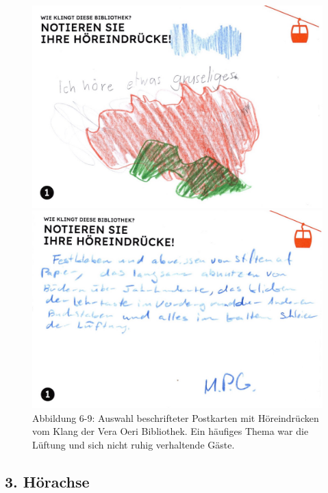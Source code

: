 \documentclass[a4paper,
fontsize=11pt,
oneside,
numbers=noperiodatend,
parskip=half-,
bibliography=totoc,
final
]{scrartcl}
\begin{document}
\begin{figure}[H]
    \begin{minipage}[b]{0.45\textwidth}
        \centering
        \includegraphics[width=\textwidth]{img/Abb8.jpg}
    \end{minipage}
    \begin{minipage}[b]{0.45\textwidth}
        \centering
        \includegraphics[width=\textwidth]{img/Abb9.jpg}
    \end{minipage}
    
    \caption{Abbildung 6-9: Auswahl beschrifteter Postkarten mit Höreindrücken vom Klang der Vera Oeri Bibliothek. Ein häufiges Thema war die Lüftung und sich nicht ruhig verhaltende Gäste.}
\end{figure}



\hypertarget{huxf6rachse-2}{%
\subsection{3. Hörachse}\label{huxf6rachse-2}}
\end{document}

